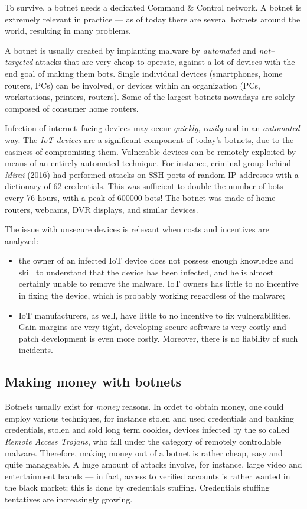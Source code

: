 \documentclass[10pt]{extreport}
\begin{document}
To survive, a botnet needs a dedicated Command \& Control network. A botnet is
extremely relevant in practice --- as of today there are several botnets around
the world, resulting in many problems.

A botnet is usually created by implanting malware by \emph{automated} and
\emph{not--targe\-ted} attacks that are very cheap to operate, against a lot of
devices with the end goal of making them bots. Single individual devices
(smartphones, home routers, PCs) can be involved, or devices within an
organization (PCs, workstations, printers, routers). Some of the largest
botnets nowadays are solely composed of consumer home routers.

Infection of internet--facing devices may occur \emph{quickly}, \emph{easily}
and in an \emph{automated} way. The \emph{IoT devices} are a significant
component of today's botnets, due to the easiness of compromising them.
Vulnerable devices can be remotely exploited by means of an entirely automated
technique. For instance, criminal group behind \emph{Mirai} (2016) had
performed attacks on SSH ports of random IP addresses with a dictionary of 62
credentials. This was sufficient to double the number of bots every 76 hours,
with a peak of 600000 bots! The botnet was made of home routers, webcams, DVR
displays, and similar devices.

The issue with unsecure devices is relevant when costs and incentives are
analyzed:
\begin{itemize}
    \item the owner of an infected IoT device does not possess enough knowledge
        and skill to understand that the device has been infected, and he is
        almost certainly unable to remove the malware. IoT owners has little to
        no incentive in fixing the device, which is probably working regardless
        of the malware;
    \item IoT manufacturers, as well, have little to no incentive to fix
        vulnerabilities. Gain margins are very tight, developing secure
        software is very costly and patch development is even more costly.
        Moreover, there is no liability of such incidents.
\end{itemize}


\subsection{Making money with botnets}

Botnets usually exist for \emph{money} reasons. In ordet to obtain money, one
could employ various techniques, for instance stolen and used credentials and
banking credentials, stolen and sold long term cookies, devices infected by the
so called \emph{Remote Access Trojans}, who fall under the category of
remotely controllable malware. Therefore, making money out of a botnet is
rather cheap, easy and quite manageable. A huge amount of attacks involve, for
instance, large video and entertainment brands --- in fact, access to verified
accounts is rather wanted in the black market; this is done by credentials
stuffing. Credentials stuffing tentatives are increasingly growing.
\end{document}
